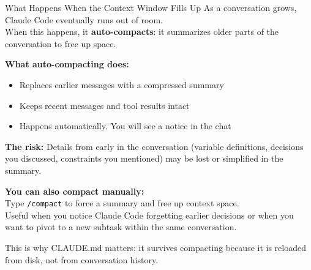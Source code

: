 \documentclass[aspectratio=169, 11pt]{beamer}
\begin{document}
\begin{frame}{What Happens When the Context Window Fills Up}
  As a conversation grows, Claude Code eventually runs out of room.\\
  When this happens, it \textbf{auto-compacts}: it summarizes older parts of the conversation to free up space.

  \vspace{0.5em}
  \textbf{What auto-compacting does:}
  \begin{itemize}
    \item Replaces earlier messages with a compressed summary
    \item Keeps recent messages and tool results intact
    \item Happens automatically. You will see a notice in the chat
  \end{itemize}

  \vspace{0.5em}
  \textbf{The risk:} Details from early in the conversation (variable definitions, decisions you discussed, constraints you mentioned) may be lost or simplified in the summary.

  \vspace{0.5em}
  \textbf{You can also compact manually:}\\
  Type \texttt{/compact} to force a summary and free up context space.\\
  Useful when you notice Claude Code forgetting earlier decisions or when you want to pivot to a new subtask within the same conversation.

  \vspace{0.5em}
  \alert{This is why CLAUDE.md matters:} it survives compacting because it is reloaded from disk, not from conversation history.
\end{frame}
\end{document}

